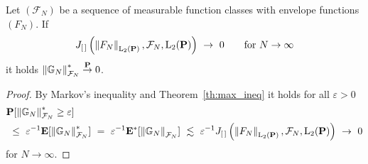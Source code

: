 \begin{lemma}
  \label{markov_max_lemma}
  Let $(\mathcal{F}_N)$ be a sequence of measurable function classes with envelope functions $(F_N)$.
  If
  \begin{gather}
    J_{[\, ]}
    \left( 
    \norm{F_N}_{\mathrm{L}_2(\P)}
    ,
    \mathcal{F}_N
    ,
    \mathrm{L}_2(\P)
    \right)
    \ 
    \to
    \ 
    0
    \qquad
    \text{for}
    \ 
    N
    \to
    \infty
  \end{gather}
  it holds 
  $
  \left\lVert\mathbb{G}_N\right\rVert^*_{\mathcal{F}_N}\overset{\mathbf{P}}{\to}0
  $.
\end{lemma}
\begin{proof}
  By Markov's inequality and Theorem~\ref{th:max_ineq} it holds for all $\varepsilon>0$
  \begin{align*}
    &
    \P
    [
  \norm{\G_N}^*_{\mathcal{F}_N}
  \ge
  \varepsilon
    ]
    \\
    &
    \ 
    \le
    \ 
    \varepsilon^{-1}
    \E
    [
  \norm{\G_N}^*_{\mathcal{F}_N}
    ]
    \ 
    =
    \ 
    \varepsilon^{-1}
    \E^*
    [
  \norm{\G_N}_{\mathcal{F}_N}
    ]
    \ 
    \lesssim
    \ 
    \varepsilon^{-1}
    J_{[\, ]}
    \left( 
    \norm{F_N}_{\mathrm{L}_2(\P)}
    ,
    \mathcal{F}_N
    ,
    \mathrm{L}_2(\P)
    \right)
    \ 
    \to
    \ 
    0
  \end{align*}
  for $N\to\infty$. 
\end{proof}

